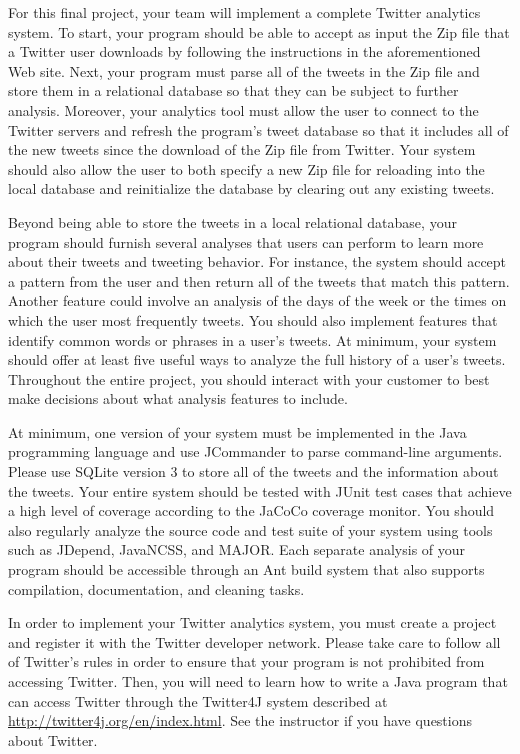 For this final project, your team will implement a complete Twitter analytics system.  To start, your program should be
able to accept as input the Zip file that a Twitter user downloads by following the instructions in the aforementioned
Web site. Next, your program must parse all of the tweets in the Zip file and store them in a relational database so
that they can be subject to further analysis. Moreover, your analytics tool must allow the user to connect to the
Twitter servers and refresh the program's tweet database so that it includes all of the new tweets since the download of
the Zip file from Twitter. Your system should also allow the user to both specify a new Zip file for reloading into the
local database and reinitialize the database by clearing out any existing tweets.

Beyond being able to store the tweets in a local relational database, your program should furnish several analyses that
users can perform to learn more about their tweets and tweeting behavior.  For instance, the system should accept a
pattern from the user and then return all of the tweets that match this pattern.  Another feature could involve an
analysis of the days of the week or the times on which the user most frequently tweets.  You should also implement
features that identify common words or phrases in a user's tweets. At minimum, your system should offer at least five
useful ways to analyze the full history of a user's tweets.  Throughout the entire project, you should interact with
your customer to best make decisions about what analysis features to include.

At minimum, one version of your system must be implemented in the Java programming language and use JCommander to parse
command-line arguments. Please use SQLite version 3 to store all of the tweets and the information about the tweets.
Your entire system should be tested with JUnit test cases that achieve a high level of coverage according to the JaCoCo
coverage monitor.  You should also regularly analyze the source code and test suite of your system using tools such as
JDepend, JavaNCSS, and MAJOR. Each separate analysis of your program should be accessible through an Ant build system
that also supports compilation, documentation, and cleaning tasks.

In order to implement your Twitter analytics system, you must create a project and register it with the Twitter
developer network.  Please take care to follow all of Twitter's rules in order to ensure that your program is not
prohibited from accessing Twitter. Then, you will need to learn how to write a Java program that can access Twitter
through the Twitter4J system described at \url{http://twitter4j.org/en/index.html}.  See the instructor if you
have questions about Twitter.

